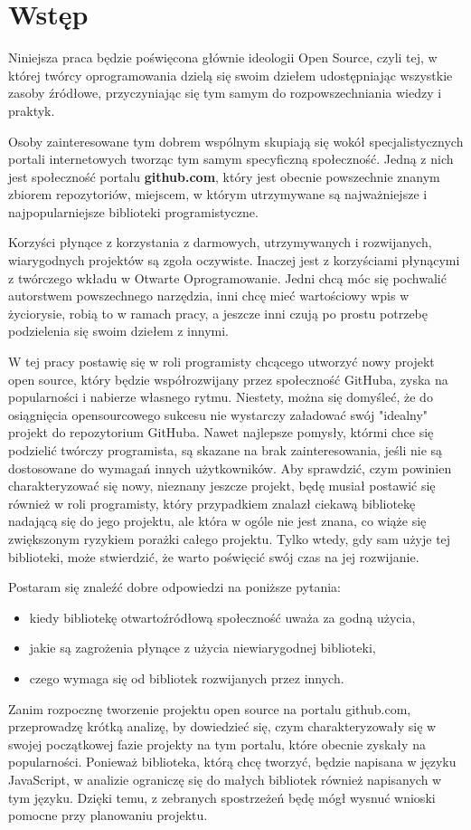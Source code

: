 \chapter{Wstęp}


Niniejsza praca będzie poświęcona głównie ideologii Open Source, czyli tej, w której twórcy oprogramowania dzielą się swoim dziełem udostępniając wszystkie zasoby źródłowe, przyczyniając się tym samym do rozpowszechniania wiedzy i praktyk.

Osoby zainteresowane tym dobrem wspólnym skupiają się wokół specjalistycznych portali internetowych tworząc tym samym specyficzną społeczność. Jedną z nich jest społeczność portalu \textbf{github.com}, który jest obecnie powszechnie znanym zbiorem repozytoriów, miejscem, w którym utrzymywane są najważniejsze i najpopularniejsze biblioteki programistyczne.

Korzyści płynące z korzystania z darmowych, utrzymywanych i rozwijanych, wiarygodnych projektów są zgoła oczywiste. Inaczej jest z korzyściami płynącymi z twórczego wkładu w Otwarte Oprogramowanie. Jedni chcą móc się pochwalić autorstwem powszechnego narzędzia, inni chcę mieć wartościowy wpis w życiorysie, robią to w ramach pracy, a jeszcze inni czują po prostu potrzebę podzielenia się swoim dziełem z innymi.

W tej pracy postawię się w roli programisty chcącego utworzyć nowy projekt open source, który będzie współrozwijany przez społeczność GitHuba, zyska na popularności i nabierze własnego rytmu. Niestety, można się domyśleć, że do osiągnięcia opensourcowego sukcesu nie wystarczy załadować swój "idealny" projekt do repozytorium GitHuba. Nawet najlepsze pomysły, którmi chce się podzielić twórczy programista, są skazane na brak zainteresowania, jeśli nie są dostosowane do wymagań innych użytkowników. Aby sprawdzić, czym powinien charakteryzować się nowy, nieznany jeszcze projekt, będę musiał postawić się również w roli programisty, który przypadkiem znalazł ciekawą bibliotekę nadającą się do jego projektu, ale która w ogóle nie jest znana, co wiąże się zwiększonym ryzykiem porażki całego projektu. Tylko wtedy, gdy sam użyje tej biblioteki, może stwierdzić, że warto poświęcić swój czas na jej rozwijanie.

Postaram się znaleźć dobre odpowiedzi na poniższe pytania:
\begin{itemize}
\item kiedy bibliotekę otwartoźródłową społeczność uważa za godną użycia,
\item jakie są zagrożenia płynące z użycia niewiarygodnej biblioteki,
\item czego wymaga się od bibliotek rozwijanych przez innych.
\end{itemize}
Zanim rozpocznę tworzenie projektu open source na portalu github.com, przeprowadzę krótką analizę, by dowiedzieć się, czym charakteryzowały się w swojej początkowej fazie projekty na tym portalu, które obecnie zyskały na popularności. Ponieważ biblioteka, którą chcę tworzyć, będzie napisana w języku JavaScript, w analizie ograniczę się do małych bibliotek również napisanych w tym języku. Dzięki temu, z zebranych spostrzeżeń będę mógł wysnuć wnioski pomocne przy planowaniu projektu.

